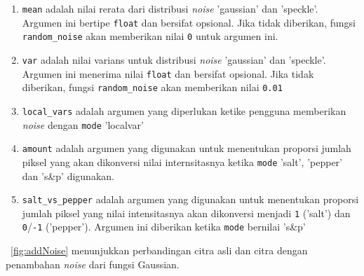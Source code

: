 \begin{enumerate}
   \item \texttt{mean} adalah nilai rerata dari distribusi \textit{noise} 'gaussian' dan 'speckle'. Argumen ini bertipe \texttt{float} dan bersifat opsional. Jika tidak diberikan, fungsi \texttt{random\_noise} akan memberikan nilai \texttt{0} untuk argumen ini.
   \item \texttt{var} adalah nilai varians untuk distribusi \textit{noise} 'gaussian' dan 'speckle'. Argumen ini menerima nilai \texttt{float} dan bersifat opsional. Jika tidak diberikan, fungsi \texttt{random\_noise} akan memberikan nilai \texttt{0.01}
   \item \texttt{local\_vars} adalah argumen yang diperlukan ketike pengguna memberikan \textit{noise} dengan \texttt{mode} 'localvar'
   \item \texttt{amount} adalah argumen yang digunakan untuk menentukan proporsi jumlah piksel yang akan dikonversi nilai internsitasnya ketika \texttt{mode} 'salt', 'pepper' dan 's\&p' digunakan.
   \item \texttt{salt\_vs\_pepper} adalah argumen yang digunakan untuk menentukan proporsi jumlah piksel yang nilai intensitasnya akan dikonversi menjadi \texttt{1} ('salt') dan \texttt{0}/\texttt{-1} ('pepper'). Argumen ini diberikan ketika \texttt{mode} bernilai 's\&p'
 \end{enumerate}
 
\figurename~\ref{fig:addNoise} menunjukkan perbandingan citra asli dan citra dengan penambahan \textit{noise} dari fungsi Gaussian.
 
